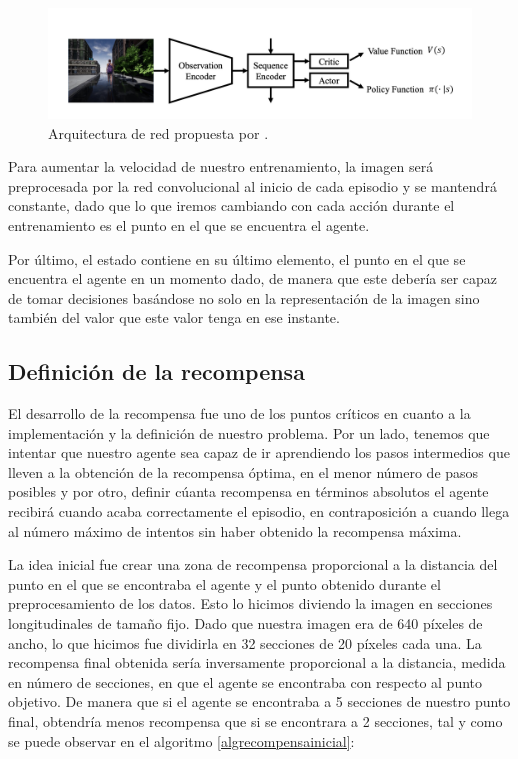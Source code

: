 \begin{figure}[H]
    \centering
    \includegraphics[scale=0.3]{figuras/luo_network_architecture.png}
    \caption[Arquitectura de red propuesta por \citet{luo2019end}.]{Arquitectura de red propuesta por \citet{luo2019end}.}
    \label{fig-arquitectura-red-luo}
\end{figure}

Para aumentar la velocidad de nuestro entrenamiento, la imagen será preprocesada por la red convolucional al inicio de cada episodio y se mantendrá constante, dado que lo que iremos cambiando con cada acción durante el entrenamiento es el punto en el que se encuentra el agente.
\medskip

Por último, el estado contiene en su último elemento, el punto en el que se encuentra el agente en un momento dado, de manera que este debería ser capaz de tomar decisiones basándose no solo en la representación de la imagen sino también del valor que este valor tenga en ese instante.

\subsection{Definición de la recompensa}
\label{definicion-de-recompensa}

El desarrollo de la recompensa fue uno de los puntos críticos en cuanto a la implementación y la definición de nuestro problema. Por un lado, tenemos que intentar que nuestro agente sea capaz de ir aprendiendo los pasos intermedios que lleven a la obtención de la recompensa óptima, en el menor número de pasos posibles y por otro, definir cúanta recompensa en términos absolutos el agente recibirá cuando acaba correctamente el episodio, en contraposición a cuando llega al número máximo de intentos sin haber obtenido la recompensa máxima.
\medskip

La idea inicial fue crear una zona de recompensa proporcional a la distancia del punto en el que se encontraba el agente y el punto obtenido durante el preprocesamiento de los datos. Esto lo hicimos diviendo la imagen en secciones longitudinales de tamaño fijo. Dado que nuestra imagen era de 640 píxeles de ancho, lo que hicimos fue dividirla en 32 secciones de 20 píxeles cada una. La recompensa final obtenida sería inversamente proporcional a la distancia, medida en número de secciones, en que el agente se encontraba con respecto al punto objetivo. De manera que si el agente se encontraba a 5 secciones de nuestro punto final, obtendría menos recompensa que si se encontrara a 2 secciones, tal y como se puede observar en el algoritmo \ref{algrecompensainicial}:
\medskip
\vspace{3ex}

\vspace{3ex}


